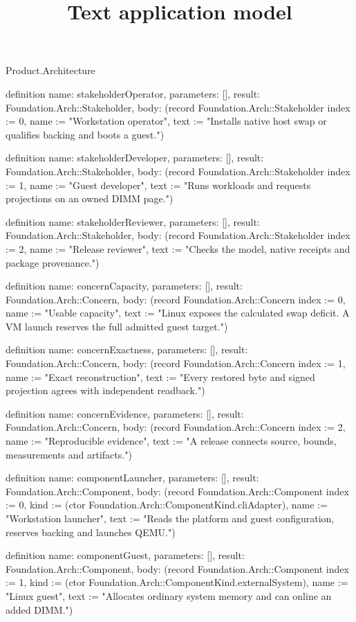 \begin{lexlean}{Product.Architecture}
\title{Text application model}
\begin{semanticmodule}
definition{
  name: stakeholderOperator, parameters: [], result: Foundation.Arch::Stakeholder,
  body: (record Foundation.Arch::Stakeholder {index := 0, name := "Workstation operator", text := "Installs native host swap or qualifies backing and boots a guest."})
}

definition{
  name: stakeholderDeveloper, parameters: [], result: Foundation.Arch::Stakeholder,
  body: (record Foundation.Arch::Stakeholder {index := 1, name := "Guest developer", text := "Runs workloads and requests projections on an owned DIMM page."})
}

definition{
  name: stakeholderReviewer, parameters: [], result: Foundation.Arch::Stakeholder,
  body: (record Foundation.Arch::Stakeholder {index := 2, name := "Release reviewer", text := "Checks the model, native receipts and package provenance."})
}

definition{
  name: concernCapacity, parameters: [], result: Foundation.Arch::Concern,
  body: (record Foundation.Arch::Concern {index := 0, name := "Usable capacity", text := "Linux exposes the calculated swap deficit. A VM launch reserves the full admitted guest target."})
}

definition{
  name: concernExactness, parameters: [], result: Foundation.Arch::Concern,
  body: (record Foundation.Arch::Concern {index := 1, name := "Exact reconstruction", text := "Every restored byte and signed projection agrees with independent readback."})
}

definition{
  name: concernEvidence, parameters: [], result: Foundation.Arch::Concern,
  body: (record Foundation.Arch::Concern {index := 2, name := "Reproducible evidence", text := "A release connects source, bounds, measurements and artifacts."})
}

definition{
  name: componentLauncher, parameters: [], result: Foundation.Arch::Component,
  body: (record Foundation.Arch::Component {index := 0, kind := (ctor Foundation.Arch::ComponentKind.cliAdapter), name := "Workstation launcher", text := "Reads the platform and guest configuration, reserves backing and launches QEMU."})
}

definition{
  name: componentGuest, parameters: [], result: Foundation.Arch::Component,
  body: (record Foundation.Arch::Component {index := 1, kind := (ctor Foundation.Arch::ComponentKind.externalSystem), name := "Linux guest", text := "Allocates ordinary system memory and can online an added DIMM."})
}


\end{semanticmodule}
\end{lexlean}
